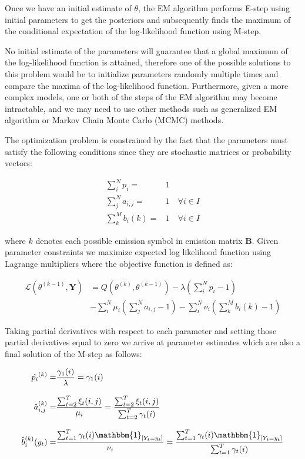 Once we have an initial estimate of $\theta$, the EM algorithm performs E-step using initial parameters to get the posteriors and 
subsequently finds the maximum of the conditional expectation of the log-likelihood function using M-step. 

No initial estimate of the parameters will guarantee that a global maximum of the log-likelihood function is attained, therefore one of the possible
solutions to this problem would be to initialize parameters randomly multiple times and compare the maxima of the log-likelihood function. Furthermore, 
given a more complex models, one or both of the steps of the EM algorithm may become intractable, and we may need to use other methods such as
generalized EM algorithm or Markov Chain Monte Carlo (MCMC) methods. \citep{Bishop2006}

The optimization problem is constrained by the fact that the parameters must satisfy the following conditions 
since they are stochastic matrices or probability vectors:

\begin{align}
\sum_i^N p_i =& 1 \\
\sum_j^N a_{i,j} =& 1 \quad  \forall i \in I \\
\sum_k^M b_{i}(k) =& 1 \quad \forall i \in I
\end{align}

where $k$ denotes each possible emission symbol in emission matrix $\textbf{B}$. Given parameter constraints we maximize 
expected log likelihood function using Lagrange multipliers where the objective function is defined as:

\begin{align}
\mathcal{L}(\theta^{(k-1)},\textbf{Y}) &= Q(\theta^{(k)}, \theta^{(k-1)}) - \lambda(\sum_i^N p_i - 1) \\ \nonumber
& - \sum_i^N \mu_i (\sum_j^N a_{i,j} -  1)  - \sum_i^N \nu_i (\sum_k^M b_{i}(k) - 1)
\end{align}

 Taking partial derivatives with respect to each parameter and setting those partial derivatives equal to zero we arrive at 
 parameter estimates which are also a final solution of the M-step as follows:

\begin{align}
\hat{p_i}^{(k)} = & \frac{\gamma_1(i)}{\lambda} = \gamma_1(i) \\[0.3cm]
\hat{a}_{i,j}^{(k)} = & \frac{\sum_{t=2}^{T} \xi_t (i,j)}{\mu_i} = \frac{\sum_{t=2}^{T} \xi_t (i,j)}{\sum_{t=2}^{T} \gamma_t (i)} \\[0.3cm]
\hat{b}_{i}^{(k)}(y_t) = & \frac{\sum_{t=1}^{T} \gamma_t (i) \mathbbm{1}_{[Y_t = y_t ]}}{\nu_i} = \frac{ \sum_{t=1}^{T} \gamma_t (i) \mathbbm{1}_{[Y_t = y_t ]}}{\sum_{t=1}^{T} \gamma_t (i)} 
\end{align}

